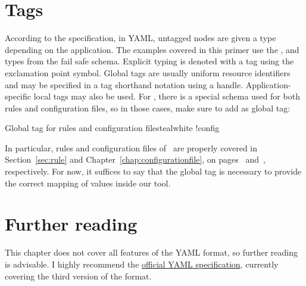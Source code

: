 \section{Tags}
\label{sec:yamltags}

According to the specification, in YAML, untagged nodes are given a type depending on the application. The examples covered in this primer use the ,  and  types from the fail safe schema. Explicit typing is denoted with a tag using the exclamation point symbol. Global tags are usually uniform resource identifiers and may be specified in a tag shorthand notation using a handle. Application-specific local tags may also be used. For \arara, there is a special schema used for both rules and configuration files, so in those cases, make sure to add  as global tag:

\begin{codebox}{Global tag for rules and configuration files}{teal}{\icnote}{white}
!config
\end{codebox}

In particular, rules and configuration files of \arara\ are properly covered in Section~\ref{sec:rule} and Chapter~\ref{chap:configurationfile}, on pages~\pageref{sec:rule} and~\pageref{chap:configurationfile}, respectively. For now, it suffices to say that the  global tag is necessary to provide the correct mapping of values inside our tool.

\section{Further reading}
\label{sec:yamlfurtherreading}

This chapter does not cover all features of the YAML format, so further reading is advisable. I highly recommend the \href{http://yaml.org/spec/1.2/spec.html}{official YAML specification}, currently covering the third version of the format.
